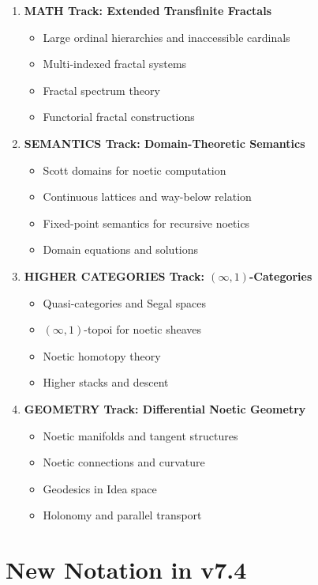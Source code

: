 \documentclass[11pt,twoside,openright]{book}
\theoremstyle{definition}
\theoremstyle{plain}
\theoremstyle{remark}
\begin{document}
\begin{enumerate}
    \item \textbf{MATH Track: Extended Transfinite Fractals}
    \begin{itemize}
        \item Large ordinal hierarchies and inaccessible cardinals
        \item Multi-indexed fractal systems
        \item Fractal spectrum theory
        \item Functorial fractal constructions
    \end{itemize}
    
    \item \textbf{SEMANTICS Track: Domain-Theoretic Semantics}
    \begin{itemize}
        \item Scott domains for noetic computation
        \item Continuous lattices and way-below relation
        \item Fixed-point semantics for recursive noetics
        \item Domain equations and solutions
    \end{itemize}
    
    \item \textbf{HIGHER CATEGORIES Track: $(\infty,1)$-Categories}
    \begin{itemize}
        \item Quasi-categories and Segal spaces
        \item $(\infty,1)$-topoi for noetic sheaves
        \item Noetic homotopy theory
        \item Higher stacks and descent
    \end{itemize}
    
    \item \textbf{GEOMETRY Track: Differential Noetic Geometry}
    \begin{itemize}
        \item Noetic manifolds and tangent structures
        \item Noetic connections and curvature
        \item Geodesics in Idea space
        \item Holonomy and parallel transport
    \end{itemize}
\end{enumerate}

\section*{New Notation in v7.4}
\end{document}
